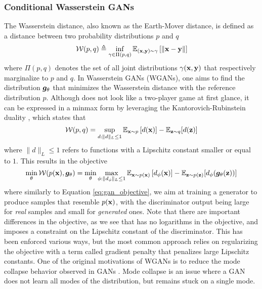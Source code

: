 \subsubsection{Conditional Wasserstein GANs}
The Wasserstein distance, also known as the Earth-Mover distance, is defined as a distance between two probability distributions $p$ and $q$
\begin{equation}
    \mathcal{W}(p,q) \triangleq \inf_{\gamma \in \Pi(p,q)}\mathbb{E}_{({\mathbf{x}},{\mathbf{y}}) \sim \gamma} \left[\|{\mathbf{x}}-{\mathbf{y}}\|\right]\label{eq:w1}
\end{equation}
where $\Pi(p,q)$ denotes the set of all joint distributions $\gamma({\mathbf{x}},{\mathbf{y}})$ that respectively marginalize to $p$ and $q$. In Wasserstein GANs (WGANs), one aims to find the distribution ${\bm{g}}_\theta$ that minimizes the Wasserstein distance with the reference distribution $p$. Although  does not look like a two-player game at first glance, it can be expressed in a minmax form by leveraging the Kantorovich-Rubinstein duality  \citep[Remark 6.5 on p.~95]{villani2008optimal}, which states that
\begin{equation}
    \mathcal{W}(p, q) = \sup_{d: \|d\|_L \leq 1} \mathbb{E}_{{\mathbf{x}}\sim p}\left[d({\mathbf{x}})\right] -  \mathbb{E}_{{\mathbf{z}}\sim q}[d({\mathbf{z}})]\label{eq:kr}
\end{equation}
where $\|d\|_L \leq 1$ refers to functions with a Lipschitz constant smaller or equal to $1$. This results in the objective
\begin{equation}
    \min_\theta \mathcal{W}(p({\mathbf{x}}),{\bm{g}}_\theta) = \min_\theta \max_{\phi: \|d_\phi\|_L \leq 1} \mathbb{E}_{{\mathbf{x}}\sim p({\mathbf{x}})}\left[d_\phi({\mathbf{x}})\right] -  \mathbb{E}_{{\mathbf{z}}\sim p({\mathbf{z}})}[d_\phi({\bm{g}}_\theta({\mathbf{z}}))]\label{eq:wgan_obj}
\end{equation}
where similarly to Equation \ref{eq:gan_objective}, we aim at training a generator to produce samples that resemble $p({\mathbf{x}})$, with the discriminator output being large for \textit{real} samples and small for \textit{generated} ones. Note that there are important differences in the objective, as we see that  has no logarithms in the objective, and imposes a constraint on the Lipschitz constant of the discriminator. This has been enforced various ways, but the most common approach relies on regularizing the objective with a term called gradient penalty \citep{gulrajani2017improved} that penalizes large Lipschitz constants. One of the original motivations of WGANs is to reduce the mode collapse behavior observed in GANs \citep{arjovsky2017wasserstein}. Mode collapse is an issue where a GAN does not learn all modes of the distribution, but remains stuck on a single mode.


